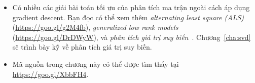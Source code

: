 \begin{itemize}
 
    \item Có nhiều các giải bài toán tối ưu của phân tích ma trận ngoài cách áp dụng gradient descent. Bạn đọc có thể xem thêm
    \textit{alternating least square (ALS)} (\url{https://goo.gl/g2M4fb}),
    \textit{generalized low rank models} (\url{https://goo.gl/DrDWyW}), và
    \textit{phân tích giá trị suy biến}~\cite{sarwar2002incremental,paterek2007improving}.
    Chương~\ref{cha:svd} sẽ trình bày kỹ về phân tích giá trị suy biến. 

    \item Mã nguồn trong chương này có thể được tìm thấy tại \url{https://goo.gl/XbbFH4}.
\end{itemize} 
 
 
 
 
